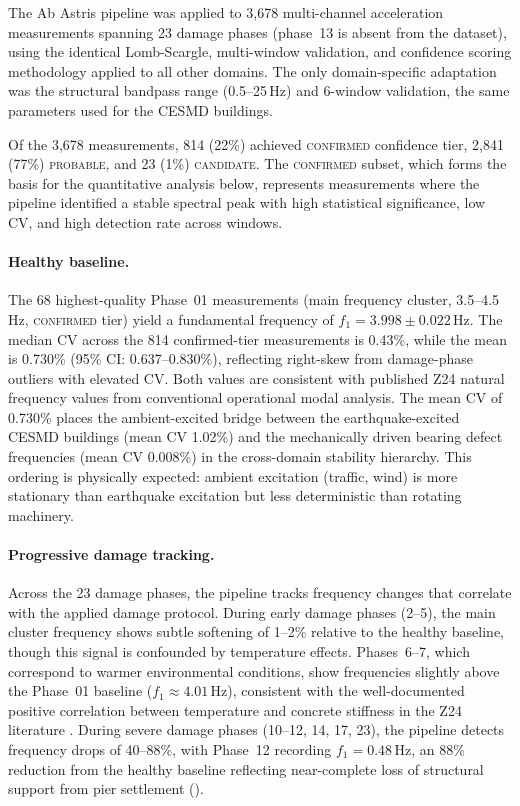 \documentclass[11pt,a4paper]{article}
\begin{document}
The Ab Astris pipeline was applied to 3{,}678 multi-channel acceleration measurements spanning 23 damage phases (phase~13 is absent from the dataset), using the identical Lomb-Scargle, multi-window validation, and confidence scoring methodology applied to all other domains. The only domain-specific adaptation was the structural bandpass range (0.5--25\,Hz) and 6-window validation, the same parameters used for the CESMD buildings.

Of the 3{,}678 measurements, 814 (22\%) achieved \textsc{confirmed} confidence tier, 2{,}841 (77\%) \textsc{probable}, and 23 (1\%) \textsc{candidate}. The \textsc{confirmed} subset, which forms the basis for the quantitative analysis below, represents measurements where the pipeline identified a stable spectral peak with high statistical significance, low CV, and high detection rate across windows.

\paragraph{Healthy baseline.} The 68 highest-quality Phase~01 measurements (main frequency cluster, 3.5--4.5\,Hz, \textsc{confirmed} tier) yield a fundamental frequency of $f_1 = 3.998 \pm 0.022$\,Hz. The median CV across the 814 confirmed-tier measurements is 0.43\%, while the mean is 0.730\% (95\% CI: 0.637--0.830\%), reflecting right-skew from damage-phase outliers with elevated CV. Both values are consistent with published Z24 natural frequency values from conventional operational modal analysis. The mean CV of 0.730\% places the ambient-excited bridge between the earthquake-excited CESMD buildings (mean CV 1.02\%) and the mechanically driven bearing defect frequencies (mean CV 0.008\%) in the cross-domain stability hierarchy. This ordering is physically expected: ambient excitation (traffic, wind) is more stationary than earthquake excitation but less deterministic than rotating machinery.

\paragraph{Progressive damage tracking.} Across the 23 damage phases, the pipeline tracks frequency changes that correlate with the applied damage protocol. During early damage phases (2--5), the main cluster frequency shows subtle softening of 1--2\% relative to the healthy baseline, though this signal is confounded by temperature effects. Phases~6--7, which correspond to warmer environmental conditions, show frequencies slightly above the Phase~01 baseline ($f_1 \approx 4.01$\,Hz), consistent with the well-documented positive correlation between temperature and concrete stiffness in the Z24 literature \citep{Peeters2001,Reynders2014}. During severe damage phases (10--12, 14, 17, 23), the pipeline detects frequency drops of 40--88\%, with Phase~12 recording $f_1 = 0.48$\,Hz, an 88\% reduction from the healthy baseline reflecting near-complete loss of structural support from pier settlement ().
\end{document}
